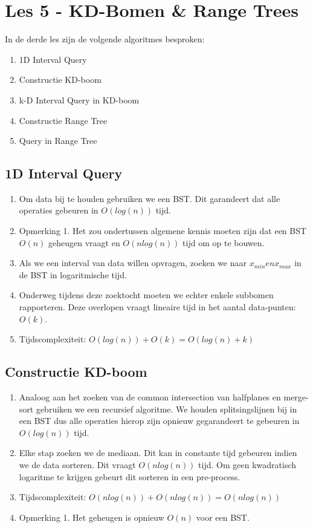 \documentclass[12pt,a4paper]{article}
\begin{document}
	\section{Les 5 - KD-Bomen \& Range Trees}
		In de derde les zijn de volgende algoritmes besproken:
		\begin{enumerate}
			\item 1D Interval Query
			\item Constructie KD-boom
			\item k-D Interval Query in KD-boom
			\item Constructie Range Tree
			\item Query in Range Tree
		\end{enumerate}   
	
		\subsection{1D Interval Query}
			\begin{enumerate}
				\item Om data bij te houden gebruiken we een BST. Dit garandeert dat alle operaties gebeuren in $O(log (n))$ tijd.
				\item Opmerking 1. Het zou ondertussen algemene kennis moeten zijn dat een BST $O(n)$ geheugen vraagt en $O(n log (n))$ tijd om op te bouwen.
				\item Als we een interval van data willen opvragen, zoeken we naar $x_{min} en x_{max}$ in de BST in logaritmische tijd. 
				\item Onderweg tijdens deze zoektocht moeten we echter enkele subbomen rapporteren. Deze overlopen vraagt lineaire tijd in het aantal data-punten: $O(k)$. 
				\item Tijdscomplexiteit: $O(log (n)) + O(k) = O(log (n) + k)$
			\end{enumerate}
		
		\subsection{Constructie KD-boom}
		\begin{enumerate}
			\item Analoog aan het zoeken van de common intersection van halfplanes en merge-sort gebruiken we een recursief algoritme. We houden splitsingslijnen bij in een BST dus alle operaties hierop zijn opnieuw gegarandeert te gebeuren in $O(log (n))$ tijd. 
			\item Elke stap zoeken we de mediaan. Dit kan in constante tijd gebeuren indien we de data sorteren. Dit vraagt $O(n log (n))$ tijd. Om geen kwadratisch logaritme te krijgen gebeurt dit sorteren in een pre-process. 
			\item Tijdscomplexiteit: $O(n log (n)) + O(n log (n)) = O(n log (n))$
			\item Opmerking 1. Het geheugen is opnieuw $O(n)$ voor een BST. 
		\end{enumerate}
	
\end{document}
